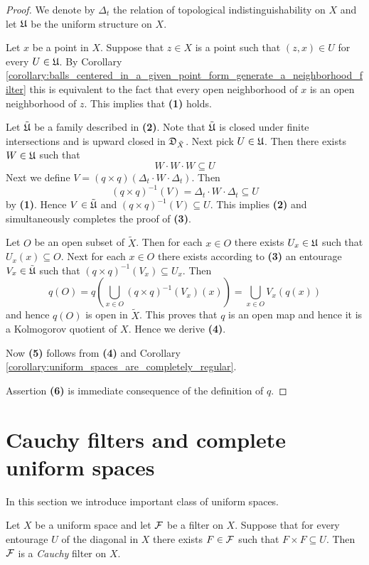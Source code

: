 \begin{proof}
	We denote by $\Delta_t$ the relation of topological indistinguishability on $X$ and let ${\mathfrak U}$ be the uniform structure on $X$.

	Let $x$ be a point in $X$. Suppose that $z \in X$ is a point such that $(z, x) \in U$ for every $U \in {\mathfrak U}$. By Corollary \ref{corollary:balls_centered_in_a_given_point_form_generate_a_neighborhood_filter} this is equivalent to the fact that every open neighborhood of $x$ is an open neighborhood of $z$. This implies that \textbf{(1)} holds.

	Let $\tilde{{\mathfrak U}}$ be a family described in \textbf{(2)}. Note that $\tilde{{\mathfrak U}}$ is closed under finite intersections and is upward closed in ${\mathfrak D}_{\tilde{X}}$. Next pick $U \in {\mathfrak U}$. Then there exists $W \in {\mathfrak U}$ such that 
	$$W\cdot W \cdot W \subseteq U$$
	Next we define $V = \left(q\times q\right)\left(\Delta_t\cdot W\cdot \Delta_t\right)$. Then 
	$$\left(q\times q\right)^{-1}(V) = \Delta_t\cdot W\cdot \Delta_t \subseteq U$$
	by \textbf{(1)}. Hence $V \in \tilde{{\mathfrak U}}$ and $\left(q\times q\right)^{-1}(V)\subseteq U$. This implies \textbf{(2)} and simultaneously completes the proof of \textbf{(3)}.

	Let $O$ be an open subset of $\tilde{X}$. Then for each $x \in O$ there exists $U_x \in {\mathfrak U}$ such that $U_x(x)\subseteq O$. Next for each $x \in O$ there exists according to \textbf{(3)} an entourage $V_x \in \tilde{{\mathfrak U}}$ such that $\left(q\times q\right)^{-1}(V_x) \subseteq U_x$. Then 
	$$q(O) = q\left(\bigcup_{x\in O}\left(q\times q\right)^{-1}(V_x)(x)\right) = \bigcup_{x \in O}V_x\left(q(x)\right)$$
	and hence $q(O)$ is open in $\tilde{X}$. This proves that $q$ is an open map and hence it is a Kolmogorov quotient of $X$. Hence we derive \textbf{(4)}.

	Now \textbf{(5)} follows from \textbf{(4)} and Corollary \ref{corollary:uniform_spaces_are_completely_regular}.

	Assertion \textbf{(6)} is immediate consequence of the definition of $q$. 
\end{proof}

\section{Cauchy filters and complete uniform spaces}
\noindent
In this section we introduce important class of uniform spaces.

\begin{definition}
	Let $X$ be a uniform space and let ${\mathcal F}$ be a filter on $X$. Suppose that for every entourage $U$ of the diagonal in $X$ there exists $F \in {\mathcal F}$ such that $F\times F \subseteq U$. Then ${\mathcal F}$ is a \textit{Cauchy} filter on $X$.
\end{definition}

